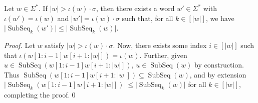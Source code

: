 \documentclass[runningheads,UKenglish,cleveref, autoref, thm-restate]{llncs}
\DeclareMathOperator{\arch}{ar}
\DeclareMathOperator{\rest}{r}
\DeclareMathOperator\ScatFact{SubSeq}
\newif\ifpaper
\begin{document}
\begin{lemma}\label{lemma:min-existent-sf-word-size}
    Let $w\in\Sigma^*$. If $|w| > \iota(w)\cdot \sigma$, then there exists a word $w'\in\Sigma^*$ with
    $\iota(w') = \iota(w)$ and $|w'| = \iota(w)\cdot \sigma$ such that, for all $k\in[|w|]$, we have $\vert \ScatFact_k(w') \vert \leq \vert \ScatFact_k(w) \vert$.
\end{lemma}
\ifpaper
\begin{proof}
	Let $w$ satisfy $\vert w \vert > \iota(w) \cdot \sigma$. Now, there exists some index $i \in [\vert w \vert]$ such that $\iota(w[1:i - 1] w[i + 1:\vert w \vert]) = \iota(w)$. Further, given $u \in \ScatFact(w[1:i - 1] w[i + 1: \vert w \vert])$, $u \in \ScatFact(w)$ by construction. Thus $\ScatFact(w[1:i - 1] w[i + 1:\vert w \vert]) \subseteq \ScatFact(w)$, and by extension $\vert \ScatFact_k(w[1:i - 1] w[i + 1:\vert w \vert]) \vert \leq \vert \ScatFact_k(w) \vert$ for all $k\in[|w|]$, completing the proof.\qed
\end{proof}
\else
\begin{proof}
	Let $w$ satisfy $\vert w \vert > \iota(w) \cdot \sigma$. Now, there exists some index $i \in [\vert w \vert]$ such that $\iota(w[1:i - 1] w[i + 1:\vert w \vert]) = \iota(w)$. Further, given $u \in \ScatFact(w[1:i - 1] w[i + 1: \vert w \vert])$, $u \in \ScatFact(w)$ by construction. Thus $\ScatFact(w[1:i - 1] w[i + 1:\vert w \vert]) \subseteq \ScatFact(w)$, and by extension $\vert \ScatFact_k(w[1:i - 1] w[i + 1:\vert w \vert]) \vert \leq \vert \ScatFact_k(w) \vert$ for all $k\in[|w|]$, completing the proof.\qed
\end{proof}
\fi
\end{document}
